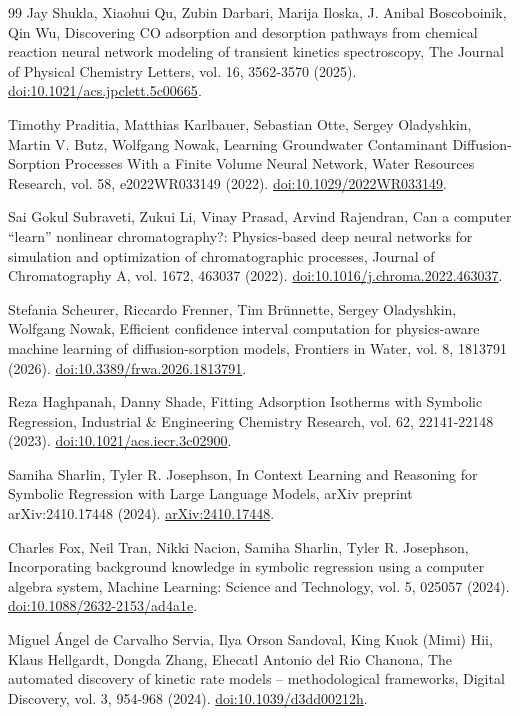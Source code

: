 \begin{thebibliography}{99}
 Jay Shukla, Xiaohui Qu, Zubin Darbari, Marija Iloska, J. Anibal Boscoboinik, Qin Wu, Discovering CO adsorption and desorption pathways from chemical reaction neural network modeling of transient kinetics spectroscopy, The Journal of Physical Chemistry Letters, vol. 16, 3562-3570 (2025). \href{https://doi.org/10.1021/acs.jpclett.5c00665}{doi:10.1021/acs.jpclett.5c00665}.

 Timothy Praditia, Matthias Karlbauer, Sebastian Otte, Sergey Oladyshkin, Martin V. Butz, Wolfgang Nowak, Learning Groundwater Contaminant Diffusion-Sorption Processes With a Finite Volume Neural Network, Water Resources Research, vol. 58, e2022WR033149 (2022). \href{https://doi.org/10.1029/2022WR033149}{doi:10.1029/2022WR033149}.

 Sai Gokul Subraveti, Zukui Li, Vinay Prasad, Arvind Rajendran, Can a computer ``learn'' nonlinear chromatography?: Physics-based deep neural networks for simulation and optimization of chromatographic processes, Journal of Chromatography A, vol. 1672, 463037 (2022). \href{https://doi.org/10.1016/j.chroma.2022.463037}{doi:10.1016/j.chroma.2022.463037}.

 Stefania Scheurer, Riccardo Frenner, Tim Brünnette, Sergey Oladyshkin, Wolfgang Nowak, Efficient confidence interval computation for physics-aware machine learning of diffusion-sorption models, Frontiers in Water, vol. 8, 1813791 (2026). \href{https://doi.org/10.3389/frwa.2026.1813791}{doi:10.3389/frwa.2026.1813791}.

 Reza Haghpanah, Danny Shade, Fitting Adsorption Isotherms with Symbolic Regression, Industrial \& Engineering Chemistry Research, vol. 62, 22141-22148 (2023). \href{https://doi.org/10.1021/acs.iecr.3c02900}{doi:10.1021/acs.iecr.3c02900}.

 Samiha Sharlin, Tyler R. Josephson, In Context Learning and Reasoning for Symbolic Regression with Large Language Models, arXiv preprint arXiv:2410.17448 (2024). \href{https://arxiv.org/abs/2410.17448}{arXiv:2410.17448}.


 Charles Fox, Neil Tran, Nikki Nacion, Samiha Sharlin, Tyler R. Josephson, Incorporating background knowledge in symbolic regression using a computer algebra system, Machine Learning: Science and Technology, vol. 5, 025057 (2024). \href{https://doi.org/10.1088/2632-2153/ad4a1e}{doi:10.1088/2632-2153/ad4a1e}.

 Miguel Ángel de Carvalho Servia, Ilya Orson Sandoval, King Kuok (Mimi) Hii, Klaus Hellgardt, Dongda Zhang, Ehecatl Antonio del Rio Chanona, The automated discovery of kinetic rate models -- methodological frameworks, Digital Discovery, vol. 3, 954-968 (2024). \href{https://doi.org/10.1039/d3dd00212h}{doi:10.1039/d3dd00212h}.


\end{thebibliography}
